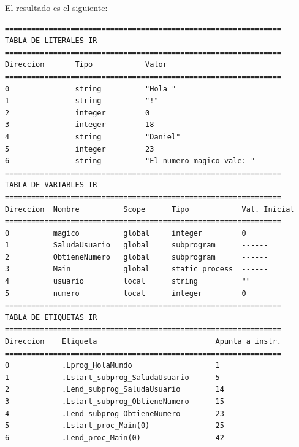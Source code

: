 \noindent
El resultado es el siguiente:
\begin{verbatim}
===============================================================
TABLA DE LITERALES IR
===============================================================
Direccion       Tipo            Valor           
===============================================================
0               string          "Hola "         
1               string          "!"             
2               integer         0               
3               integer         18              
4               string          "Daniel"        
5               integer         23              
6               string          "El numero magico vale: "
===============================================================
TABLA DE VARIABLES IR
===============================================================
Direccion  Nombre          Scope      Tipo            Val. Inicial    
===============================================================
0          magico          global     integer         0               
1          SaludaUsuario   global     subprogram      ------          
2          ObtieneNumero   global     subprogram      ------          
3          Main            global     static process  ------          
4          usuario         local      string          ""              
5          numero          local      integer         0               
===============================================================
TABLA DE ETIQUETAS IR
===============================================================
Direccion    Etiqueta                           Apunta a instr.                    
===============================================================
0            .Lprog_HolaMundo                   1                                  
1            .Lstart_subprog_SaludaUsuario      5                                  
2            .Lend_subprog_SaludaUsuario        14                                 
3            .Lstart_subprog_ObtieneNumero      15                                 
4            .Lend_subprog_ObtieneNumero        23                                 
5            .Lstart_proc_Main(0)               25                                 
6            .Lend_proc_Main(0)                 42                                 


\end{verbatim}
